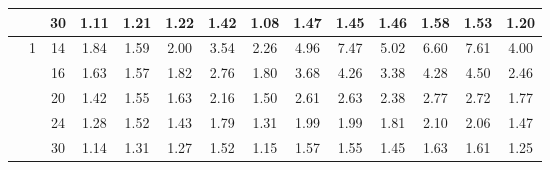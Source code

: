 \documentclass[num-refs]{wiley-article}
\begin{document}
\begin{table}[htbp!]
\begin{tabular}[t]{cccccccccccccc}
& & 30 & 1.11 & 1.21 & 1.22 & 1.42 & 1.08 & 1.47 & 1.45 & 1.46 & 1.58 & 1.53 & 1.20\\
\hline
 & 1 & 14 & 1.84 & 1.59 & 2.00 & 3.54 & 2.26 & 4.96 & 7.47 & 5.02 & 6.60 & 7.61 & 4.00\\
& & 16 & 1.63 & 1.57 & 1.82 & 2.76 & 1.80 & 3.68 & 4.26 & 3.38 & 4.28 & 4.50 & 2.46\\
& & 20 & 1.42 & 1.55 & 1.63 & 2.16 & 1.50 & 2.61 & 2.63 & 2.38 & 2.77 & 2.72 & 1.77\\
& & 24 & 1.28 & 1.52 & 1.43 & 1.79 & 1.31 & 1.99 & 1.99 & 1.81 & 2.10 & 2.06 & 1.47\\
& & 30 & 1.14 & 1.31 & 1.27 & 1.52 & 1.15 & 1.57 & 1.55 & 1.45 & 1.63 & 1.61 & 1.25\\
\hline
\end{tabular}
\label{sce1:length}
\end{table}
\end{document}
